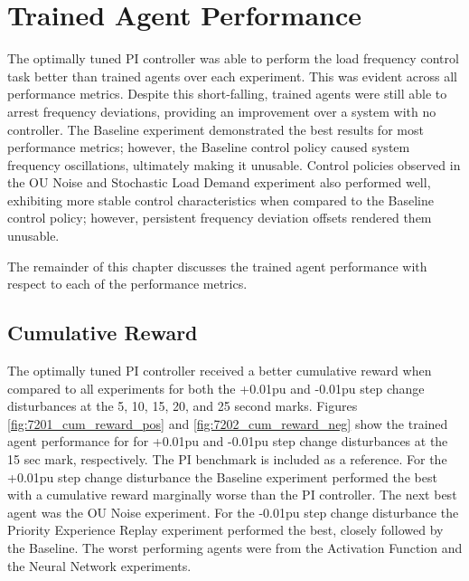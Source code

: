 \section{Trained Agent Performance}
The optimally tuned PI controller was able to perform the load frequency control task better than trained agents over each experiment. This was evident across all performance metrics. Despite this short-falling, trained agents were still able to arrest frequency deviations, providing an improvement over a system with no controller. The Baseline experiment demonstrated the best results for most performance metrics; however, the Baseline control policy caused system frequency oscillations, ultimately making it unusable. Control policies observed in the OU Noise and Stochastic Load Demand experiment also performed well, exhibiting more stable control characteristics when compared to the Baseline control policy; however, persistent frequency deviation offsets rendered them unusable. 

The remainder of this chapter discusses the trained agent performance with respect to each of the performance metrics.

\subsection{Cumulative Reward}
The optimally tuned PI controller received a better cumulative reward when compared to all experiments for both the +0.01pu and -0.01pu step change disturbances at the 5, 10, 15, 20, and 25 second marks. Figures \ref{fig:7201_cum_reward_pos} and \ref{fig:7202_cum_reward_neg} show the trained agent performance for for +0.01pu and -0.01pu step change disturbances at the 15 sec mark, respectively. The PI benchmark is included as a reference. For the +0.01pu step change disturbance the Baseline experiment performed the best with a cumulative reward marginally worse than the PI controller. The next best agent was the OU Noise experiment. For the -0.01pu step change disturbance the Priority Experience Replay experiment performed the best, closely followed by the Baseline. The worst performing agents were from the Activation Function and the Neural Network experiments.

